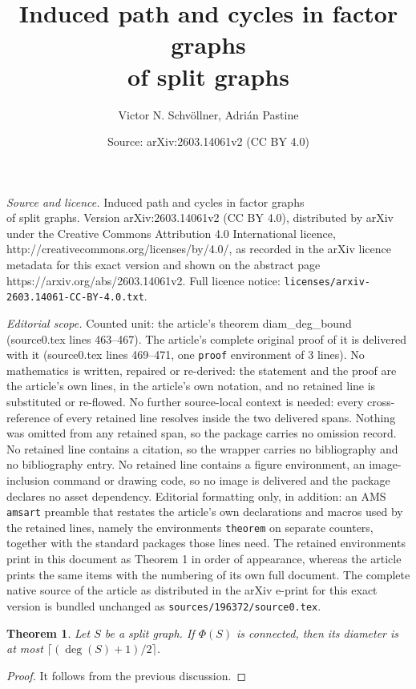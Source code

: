 \documentclass[10pt,a4paper]{amsart}
\title{Induced path and cycles in factor graphs \\ of split graphs}
\author{Victor N. Schv\"ollner, Adri\'an Pastine}
\date{Source: arXiv:2603.14061v2 (CC BY 4.0)}
\newtheorem{theorem}{Theorem}
\begin{document}
\maketitle

\noindent\emph{Source and licence.} Induced path and cycles in factor graphs \\ of split graphs. Version arXiv:2603.14061v2 (CC BY 4.0), distributed by arXiv under the Creative Commons Attribution 4.0 International licence, http://creativecommons.org/licenses/by/4.0/, as recorded in the arXiv licence metadata for this exact version and shown on the abstract page https://arxiv.org/abs/2603.14061v2. Full licence notice: \texttt{licenses/arxiv-2603.14061-CC-BY-4.0.txt}.\par\smallskip

\noindent\textit{Editorial scope.} Counted unit: the article's theorem diam\_deg\_bound (source0.tex lines 463--467). The article's complete original proof of it is delivered with it (source0.tex lines 469--471, one \texttt{proof} environment of 3 lines). No mathematics is written, repaired or re-derived: the statement and the proof are the article's own lines, in the article's own notation, and no retained line is substituted or re-flowed.  No further source-local context is needed: every cross-reference of every retained line resolves inside the two delivered spans.  Nothing was omitted from any retained span, so the package carries no omission record.  No retained line contains a citation, so the wrapper carries no bibliography and no bibliography entry.  No retained line contains a figure environment, an image-inclusion command or drawing code, so no image is delivered and the package declares no asset dependency.  Editorial formatting only, in addition: an AMS \texttt{amsart} preamble that restates the article's own declarations and macros used by the retained lines, namely the environments \texttt{theorem} on separate counters, together with the standard packages those lines need.  The retained environments print in this document as Theorem 1 in order of appearance, whereas the article prints the same items with the numbering of its own full document.  The complete native source of the article as distributed in the arXiv e-print for this exact version is bundled unchanged as \texttt{sources/196372/source0.tex}.
\begin{theorem}
	\label{diam_deg_bound}
	Let $S$ be a split graph. If $\Phi(S)$ is connected, then its diameter is at most $\lceil (\deg(S)+1)/2 \rceil$.
\end{theorem}

\begin{proof}
	It follows from the previous discussion.
\end{proof}		
\end{document}
